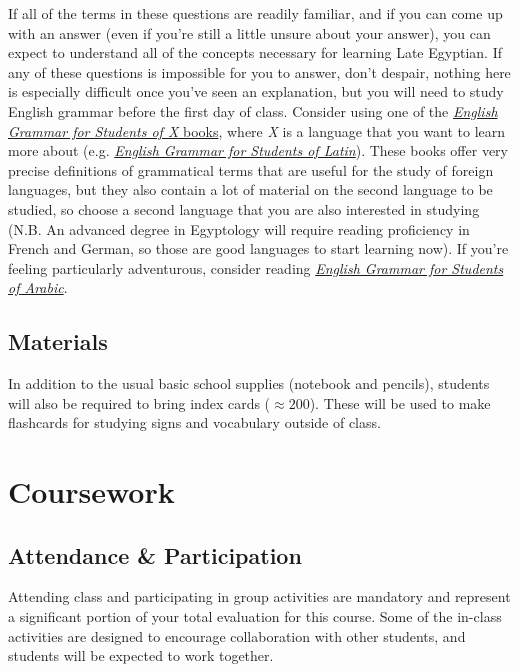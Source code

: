 \documentclass[11pt]{article}
\begin{document}
		If all of the terms in these questions are readily familiar, and if you can come up with an answer (even if you're still a little unsure about your answer), you can  expect to understand all of the concepts necessary for learning Late Egyptian.
		If any of these questions is impossible for you to answer, 
			don't despair, nothing here is especially difficult once you've seen an explanation, 
			but you will need to study English grammar before the first day of class.
		Consider using one of the \href{https://www.amazon.com/s/ref=nb_sb_noss_2?url=search-alias\%3Dstripbooks&field-keywords=english+grammar+for+students}{\emph{English Grammar for Students of X} books}, where \emph{X} is a language that you want to learn more about
			(e.g. \href{https://www.amazon.com/English-Grammar-Students-Latin-Learning/dp/0934034346/ref=sr_1_1?s=books&ie=UTF8&qid=1490732513&sr=1-1&keywords=english+grammar+for+students+of+latin}{\emph{English Grammar for Students of Latin}}).
		These books offer very precise definitions of grammatical terms that are useful for the study of foreign languages, 
			but they also contain a lot of material on the second language to be studied,
			so choose a second language that you are also interested in studying
			(N.B. An advanced degree in Egyptology will require reading proficiency in French and German, so those are good languages to start learning now).
			If you're feeling particularly adventurous, consider reading \href{https://www.amazon.com/English-Grammar-Students-Arabic-Learning/dp/0934034354}{\emph{English Grammar for Students of Arabic}}.
			
	\subsection*{Materials}
		In addition to the usual basic school supplies (notebook and pencils), students will also be required to bring index cards ($\approx 200$).
		These will be used to make flashcards for studying signs and vocabulary outside of class.
		
	\section*{Coursework}
		\subsection*{Attendance \& Participation}
			Attending class and participating in group activities are mandatory and represent a significant portion of your total evaluation for this course.
			Some of the in-class activities are designed to encourage collaboration with other students,
			and students will be expected to work together.
		
\end{document}
